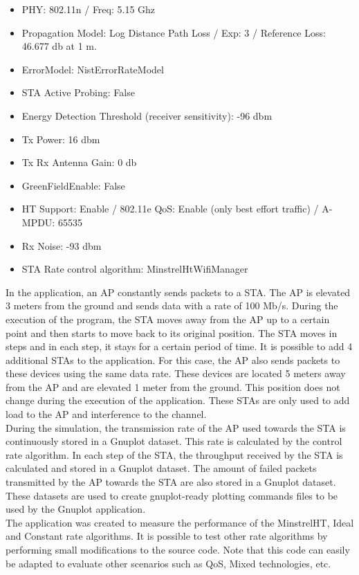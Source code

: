 \documentclass[12]{article}
\begin{document}
\begin{itemize}
 \item PHY: 802.11n / Freq: 5.15 Ghz
 \item Propagation Model: Log Distance Path Loss / Exp: 3 / Reference Loss: 46.677 db at 1 m.
 \item ErrorModel: NistErrorRateModel
 \item STA Active Probing: False
 \item Energy Detection Threshold (receiver sensitivity): -96 dbm
 \item Tx Power: 16 dbm
 \item Tx Rx Antenna Gain: 0 db
 \item GreenFieldEnable: False
 \item HT Support: Enable / 802.11e QoS: Enable (only best effort traffic) / A-MPDU: 65535
 \item Rx Noise: -93 dbm
 \item STA Rate control algorithm: MinstrelHtWifiManager
\end{itemize}

In the application, an AP constantly sends packets to a STA. The AP is elevated 3 meters from the ground and sends data with a rate of 100 Mb/s. During the execution of the program, the STA moves away from the AP up to a certain point and then starts to move back to its original position. The STA moves in steps and in each step, it stays for a certain period of time. It is possible to add 4 additional STAs to the application. For this case, the AP also sends packets to these devices using the same data rate. These devices are located 5 meters away from the AP and are elevated 1 meter from the ground. This position does not change during the execution of the application. These STAs are only used to add load to the AP and interference to the channel.\\

During the simulation, the transmission rate of the AP used towards the STA is continuously stored in a Gnuplot dataset. This rate is calculated by the control rate algorithm. In each step of the STA, the throughput received by the STA is calculated and stored in a Gnuplot dataset. The amount of failed packets transmitted by the AP towards the STA are also stored in a Gnuplot dataset. These datasets are used to create gnuplot-ready plotting commands files to be used by the Gnuplot application.\\

The application was created to measure the performance of the MinstrelHT, Ideal and Constant rate algorithms. It is possible to test other rate algorithms by performing small modifications to the source code. Note that this code can easily be adapted to evaluate other scenarios such as QoS, Mixed technologies, etc.\\
\end{document}
